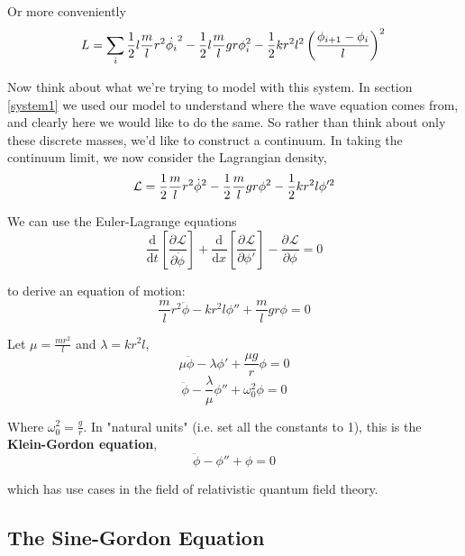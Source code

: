 \documentclass[12pt]{article}
\def\D{\mathrm{d}}
\newcommand{\diff}[3][]{\ensuremath{\frac{\D^{#1} #2}{\D #3^{#1}}}}
\newcommand{\partials}[3][]{\ensuremath{\frac{\partial^{#1} {#2}}{\partial {#3}^{#1}}}}
\begin{document}
Or more conveniently
\begin{equation}
	L = \sum_i\frac{1}{2}l\frac{m}{l}r^2\dot{\phi_i}^2 - \frac{1}{2}l\frac{m}{l}gr\phi_i^2 - \frac{1}{2}kr^2l^2\left(\frac{\phi_{i+1} - \phi_i}{l}\right)^2\\
\end{equation}

Now think about what we're trying to model with this system. In section \ref{system1} we used our model to understand where the wave equation comes from, and clearly here we would like to do the same. So rather than think about only these discrete masses, we'd like to construct a continuum. In taking the continuum limit, we now consider the Lagrangian density,
\begin{equation*}
	\mathcal{L} = \frac{1}{2}\frac{m}{l}r^2\dot{\phi}^2 - \frac{1}{2}\frac{m}{l}gr\phi^2 - \frac{1}{2}kr^2l\phi'^2\\
\end{equation*}

We can use the Euler-Lagrange equations
\begin{equation}
	\diff{}{t}\left[\partials{\mathcal{L}}{\dot{\phi}}\right] + \diff{}{x}\left[\partials{\mathcal{L}}{\phi'}\right] - \partials{\mathcal{L}}{\phi} = 0
\end{equation}

to derive an equation of motion:
\begin{equation*}
	\frac{m}{l}r^2\ddot{\phi} - kr^2l\phi'' + \frac{m}{l}gr\phi = 0
\end{equation*}

Let $\mu = \frac{mr^2}{l}$ and $\lambda = kr^2l$,
\begin{equation*}
	\mu\ddot{\phi} - \lambda\phi' + \frac{\mu g}{r}\phi = 0
\end{equation*}
\begin{equation}
	\ddot{\phi} - \frac{\lambda}{\mu}\phi'' + \omega_0^2\phi = 0
\end{equation}

Where $\omega_0^2 = \frac{g}{r}$. In "natural units" (i.e. set all the constants to 1), this is the \textbf{Klein-Gordon equation},
\begin{equation}
	\ddot{\phi} - \phi'' + \phi = 0
\end{equation}

which has use cases in the field of relativistic quantum field theory.

\subsection{The Sine-Gordon Equation}
\end{document}
